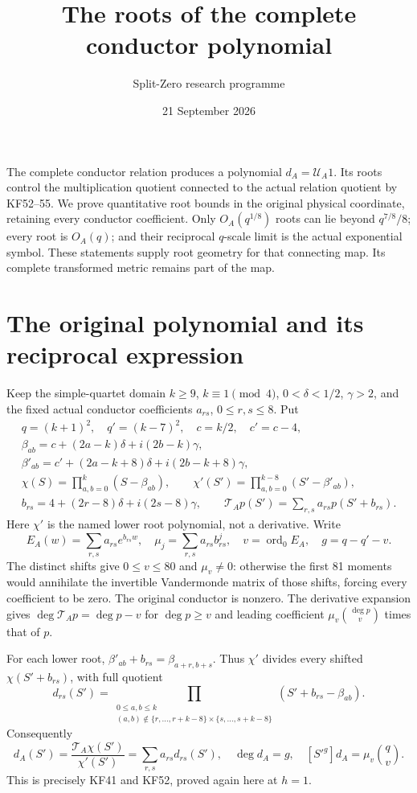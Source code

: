 \documentclass[11pt]{article}
\title{The roots of the complete conductor polynomial}
\author{Split-Zero research programme}
\date{21 September 2026}
\newcommand{\TA}{\mathcal T_A}
\newcommand{\UA}{\mathcal U_A}
\begin{document}
\maketitle
The complete conductor relation produces a polynomial $d_A=\UA1$.
Its roots control the multiplication quotient connected to the actual
relation quotient by KF52--55. We prove quantitative root bounds in the
original physical coordinate, retaining every conductor coefficient.
Only $O_A(q^{1/8})$ roots can lie beyond $q^{7/8}/8$; every root is
$O_A(q)$; and their reciprocal $q$-scale limit is the actual exponential
symbol. These statements supply root geometry for that connecting map.
Its complete transformed metric remains part of the map.

\section{The original polynomial and its reciprocal expression}
Keep the simple-quartet domain $k\ge9$, $k\equiv1\pmod4$,
$0<\delta<1/2$, $\gamma>2$, and the fixed actual conductor coefficients
$a_{rs}$, $0\le r,s\le8$. Put
\[
\begin{gathered}
q=(k+1)^2,\quad q'=(k-7)^2,\quad c=k/2,\quad c'=c-4,\\
\beta_{ab}=c+(2a-k)\delta+i(2b-k)\gamma,\\
\beta'_{ab}=c'+(2a-k+8)\delta+i(2b-k+8)\gamma,\\
\chi(S)=\prod_{a,b=0}^k(S-\beta_{ab}),\qquad
\chi'(S')=\prod_{a,b=0}^{k-8}(S'-\beta'_{ab}),\\
b_{rs}=4+(2r-8)\delta+i(2s-8)\gamma,\qquad
\TA p(S')=\sum_{r,s}a_{rs}p(S'+b_{rs}).
\end{gathered}\tag{OR1}
\]
Here $\chi'$ is the named lower root polynomial, not a derivative.
Write
\[
E_A(w)=\sum_{r,s}a_{rs}e^{b_{rs}w},\quad
\mu_j=\sum_{r,s}a_{rs}b_{rs}^j,\quad
v=\operatorname{ord}_0E_A,\quad g=q-q'-v.
\tag{OR2}
\]
The distinct shifts give $0\le v\le80$ and $\mu_v\ne0$: otherwise
the first 81 moments would annihilate the invertible Vandermonde
matrix of those shifts, forcing every coefficient to be zero.
The original conductor is nonzero. The derivative expansion gives
$\deg\TA p=\deg p-v$ for $\deg p\ge v$ and leading coefficient
$\mu_v\binom{\deg p}{v}$ times that of $p$.

For each lower root, $\beta'_{ab}+b_{rs}=\beta_{a+r,b+s}$.
Thus $\chi'$ divides every shifted $\chi(S'+b_{rs})$, with full
quotient
\[
d_{rs}(S')=\prod_{\substack{0\le a,b\le k\\
(a,b)\notin\{r,\ldots,r+k-8\}\times\{s,\ldots,s+k-8\}}}
(S'+b_{rs}-\beta_{ab}).
\]
Consequently
\[
d_A(S')=\frac{\TA\chi(S')}{\chi'(S')}=\sum_{r,s}a_{rs}d_{rs}(S'),
\quad \deg d_A=g,\quad
[S'^g]d_A=\mu_v\binom qv.
\tag{OR3}
\]
This is precisely KF41 and KF52, proved again here at $h=1$.
\end{document}
